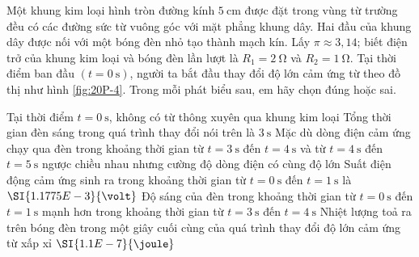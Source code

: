 \begin{ex}
	Một khung kim loại hình tròn đường kính $\SI{5}{\centi\meter}$ được đặt trong vùng từ trường đều có các đường sức từ vuông góc với mặt phẳng khung dây. Hai đầu của khung dây được nối với một bóng đèn nhỏ tạo thành mạch kín. Lấy $\pi \approx 3,14$; biết điện trở của khung kim loại và bóng đèn lần lượt là $R_1=\SI{2}{\ohm}$ và $R_2=\SI{1}{\ohm}$. Tại thời điểm ban đầu $(t=\SI{0}{\second})$, người ta bắt đầu thay đổi độ lớn cảm ứng từ theo đồ thị như hình \ref{fig:20P-4}. Trong mỗi phát biểu sau, em hãy chọn đúng hoặc sai.	
	\begin{center}
		\label{fig:20P-4}
	\end{center}
	
	\choiceTFt
	{\True Tại thời điểm $t=\SI{0}{\second}$, không có từ thông xuyên qua khung kim loại}
	{\True Tổng thời gian đèn sáng trong quá trình thay đổi nói trên là $\SI{3}{\second}$}
	{Mặc dù dòng điện cảm ứng chạy qua đèn trong khoảng thời gian từ $t=\SI{3}{\second}$ đến $t=\SI{4}{\second}$ và từ $t=\SI{4}{\second}$ đến $t=\SI{5}{\second}$ ngược chiều nhau nhưng cường độ dòng điện có cùng độ lớn}
	{Suất điện động cảm ứng sinh ra trong khoảng thời gian từ $t=\SI{0}{\second}$ đến $t=\SI{1}{\second}$ là $\SI{1.1775E-3}{\volt}$}
	{Độ sáng của đèn trong khoảng thời gian từ $t=\SI{0}{\second}$ đến $t=\SI{1}{\second}$ mạnh hơn trong khoảng thời gian từ $t=\SI{3}{\second}$ đến $t=\SI{4}{\second}$}
	{\True Nhiệt lượng toả ra trên bóng đèn trong một giây cuối cùng của quá trình thay đổi độ lớn cảm ứng từ xấp xỉ $\SI{1.1E-7}{\joule}$}
	\loigiai{
	}
\end{ex}
